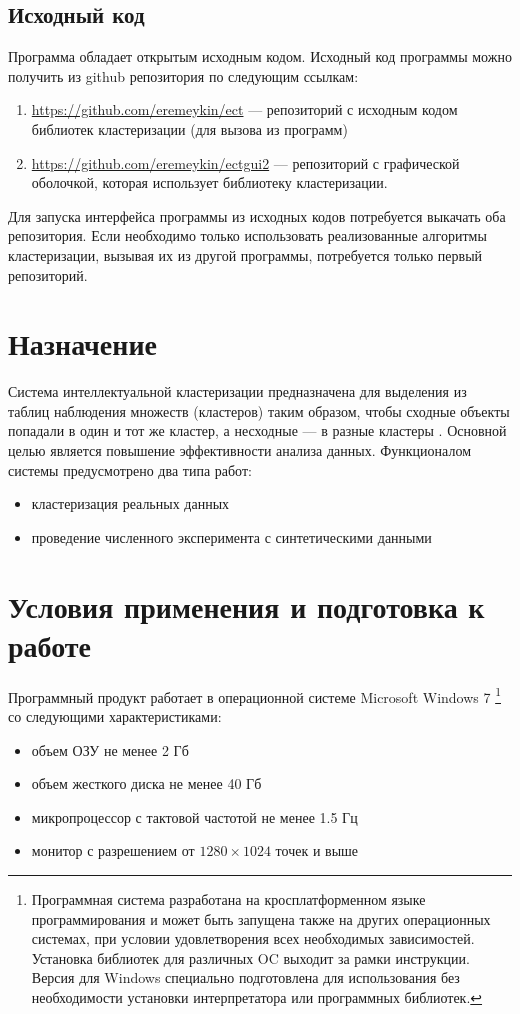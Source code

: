 \documentclass[12pt,tikz]{instruction}
\begin{document}
\subsection{Исходный код}
Программа обладает открытым исходным кодом. Исходный код программы можно получить из github репозитория по следующим ссылкам:
\begin{enumerate}
	\item \url{https://github.com/eremeykin/ect} --- репозиторий с исходным кодом библиотек кластеризации (для вызова из \Python программ)
	\item \url{https://github.com/eremeykin/ectgui2} --- репозиторий с графической оболочкой, которая использует библиотеку кластеризации.
\end{enumerate}
Для запуска  интерфейса программы из исходных кодов потребуется выкачать оба репозитория. Если необходимо только использовать реализованные алгоритмы кластеризации, вызывая их из другой \Python программы, потребуется только первый репозиторий.

\section{Назначение}

Система интеллектуальной кластеризации \SysName предназначена для выделения из таблиц наблюдения множеств (кластеров) таким образом, чтобы сходные объекты попадали в один и тот же кластер, а несходные — в разные кластеры \cite{data-science}. Основной целью \SysName является повышение эффективности анализа данных. Функционалом системы предусмотрено два типа работ:
\begin{itemize}
	\item кластеризация реальных данных
	\item проведение численного эксперимента с синтетическими данными
\end{itemize}

\section{Условия применения и подготовка к работе}

Программный продукт работает в операционной системе Microsoft Windows 7 \footnote{Программная система разработана на кросплатформенном языке программирования \Python и может быть запущена также на других операционных системах, при условии удовлетворения всех необходимых зависимостей. Установка библиотек для различных OC выходит за рамки инструкции. Версия для Windows специально подготовлена для использования без необходимости установки интерпретатора или программных библиотек.} со следующими характеристиками:
\begin{itemize}
	\item объем ОЗУ не менее 2 Гб
	\item объем жесткого диска не менее 40 Гб
	\item микропроцессор с тактовой частотой не менее 1.5 Гц
	\item монитор с разрешением от $1280 \times 1024$ точек и выше
\end{itemize}
\end{document}
